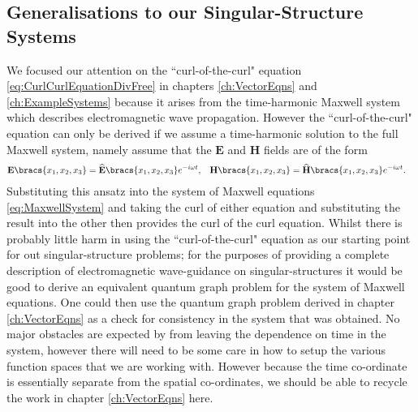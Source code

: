 \subsection{Generalisations to our Singular-Structure Systems} \label{sec:ConcFutureMaxwell}
We focused our attention on the ``curl-of-the-curl" equation \eqref{eq:CurlCurlEquationDivFree} in chapters \ref{ch:VectorEqns} and \ref{ch:ExampleSystems} because it arises from the time-harmonic Maxwell system which describes electromagnetic wave propagation.
However the ``curl-of-the-curl" equation can only be derived if we assume a time-harmonic solution to the full Maxwell system, namely assume that the $\mathbf{E}$ and $\mathbf{H}$ fields are of the form
\begin{align*}
	\mathbf{E}\bracs{x_1,x_2,x_3} = \widehat{\mathbf{E}}\bracs{x_1,x_2,x_3}e^{-i\omega t}, 
	&\quad  \mathbf{H}\bracs{x_1,x_2,x_3} = \widehat{\mathbf{H}}\bracs{x_1,x_2,x_3}e^{-i\omega t}.
\end{align*}
Substituting this ansatz into the system of Maxwell equations \eqref{eq:MaxwellSystem} and taking the curl of either equation and substituting the result into the other then provides the curl of the curl equation.
Whilst there is probably little harm in using the ``curl-of-the-curl" equation as our starting point for out singular-structure problems; for the purposes of providing a complete description of electromagnetic wave-guidance on singular-structures it would be good to derive an equivalent quantum graph problem for the system of Maxwell equations.
One could then use the quantum graph problem derived in chapter \ref{ch:VectorEqns} as a check for consistency in the system that was obtained.
No major obstacles are expected by from leaving the dependence on time in the system, however there will need to be some care in how to setup the various function spaces that we are working with.
However because the time co-ordinate is essentially separate from the spatial co-ordinates, we should be able to recycle the work in chapter \ref{ch:VectorEqns} here. \newline

